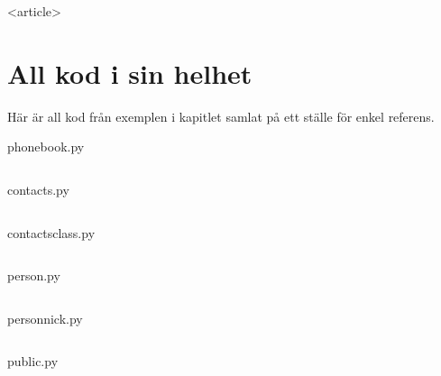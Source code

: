 \begin{onlyenv}<article>

\section{All kod i sin helhet}

Här är all kod från exemplen i kapitlet samlat på ett ställe för enkel 
referens.

\begin{frame}[fragile]
  phonebook.py \hrulefill
  \inputminted[linenos]{python}{examples/phonebook.py}
\end{frame}

\begin{frame}[fragile]
  contacts.py \hrulefill
  \inputminted[linenos]{python}{examples/contacts.py}
\end{frame}

\begin{frame}[fragile]
  contacts\textunderscore{}class.py \hrulefill
  \inputminted[linenos]{python}{examples/contacts_class.py}
\end{frame}

\begin{frame}[fragile]
  person.py \hrulefill
  \inputminted[linenos]{python}{examples/person.py}
\end{frame}

\begin{frame}[fragile]
  person\textunderscore nick.py \hrulefill
  \inputminted[linenos]{python}{examples/person_nick.py}
\end{frame}

\begin{frame}[fragile]
  public.py \hrulefill
  \inputminted[linenos]{python}{examples/public.py}
\end{frame}

\end{onlyenv}
